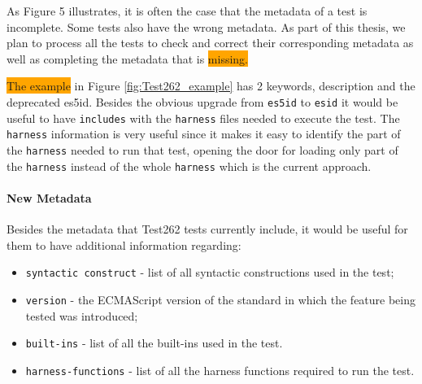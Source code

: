 \documentclass[runningheads]{llncs}
\begin{document}
As Figure 5 illustrates, it is often the case that the metadata of a test is incomplete. Some tests also have the wrong metadata. As part of this thesis, we plan to process all the tests to check and correct their corresponding metadata as well as completing the metadata that is \colorbox{orange}{missing.}


\colorbox{orange}{The example} in Figure \ref{fig:Test262_example} has 2 keywords, description and the deprecated es5id. Besides the obvious upgrade from \texttt{es5id} to \texttt{esid} it would be useful to have \texttt{includes} with the \texttt{harness} files needed to execute the test. The \texttt{harness} information is very useful since it makes it easy to identify the part of the \texttt{harness} needed to run that test, opening the door for loading only part of the \texttt{harness} instead of the whole \texttt{harness} which is the current approach.



\paragraph{New Metadata}
Besides the metadata that Test262 tests currently include, it would be useful for them to have additional information regarding:

\begin{itemize}
    \item \texttt{syntactic construct} - list of all syntactic constructions used in the test;
    \item \texttt{version} - the ECMAScript version of the standard in which the feature being tested was introduced;
    \item \texttt{built-ins} - list of all the built-ins used in the test.
    \item \texttt{harness-functions} - list of all the harness functions required to run the test.
\end{itemize}
\end{document}
